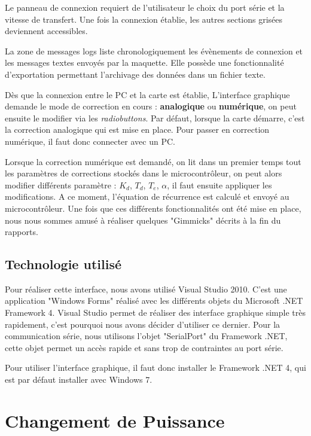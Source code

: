 \documentclass[11pt, french]{article} %
\begin{document}
Le panneau de connexion requiert de l'utilisateur le choix du port série et la vitesse de transfert. Une fois la connexion établie, les autres sections grisées deviennent accessibles. 

La zone de messages logs liste chronologiquement les évènements de connexion et les messages textes envoyés par la maquette. Elle possède une fonctionnalité d'exportation permettant l'archivage des données dans un fichier texte.

Dès que la connexion entre le PC et la carte est établie, L'interface graphique demande le mode de correction en cours :  \textbf{analogique} ou \textbf{numérique}, on peut ensuite le modifier via les \textit{radiobuttons}. 
Par défaut, lorsque la carte démarre, c'est la correction analogique qui est mise en place. Pour passer en correction numérique, il faut donc connecter avec un PC.

Lorsque la correction numérique est demandé, on lit dans un premier temps tout les paramètres de corrections stockés dans le microcontrôleur, on peut alors modifier différents paramètre : \textit{$K_d$}, \textit{$T_d$}, \textit{$T_e$}, \textit{$\alpha$}, il faut ensuite appliquer les modifications. A ce moment, l'équation de récurrence est calculé et envoyé au microcontrôleur. Une fois que ces différents fonctionnalités ont été mise en place, nous nous sommes amusé à réaliser quelques "Gimmicks" décrits à la fin du rapports.

\subsection{Technologie utilisé}
Pour réaliser cette interface, nous avons utilisé Visual Studio 2010. C'est une application "Windows Forms" réalisé avec les différents objets du Microsoft .NET Framework 4. Visual Studio permet de réaliser des interface graphique simple très rapidement, c'est pourquoi nous avons décider d'utiliser ce dernier. 
Pour la communication série, nous utilisons l'objet "SerialPort" du Framework .NET, cette objet permet un accès rapide et sans trop de contraintes au port série.

Pour utiliser l'interface graphique, il faut donc installer le Framework .NET 4, qui est par défaut installer avec Windows 7.

\section{Changement de Puissance}
\end{document}
